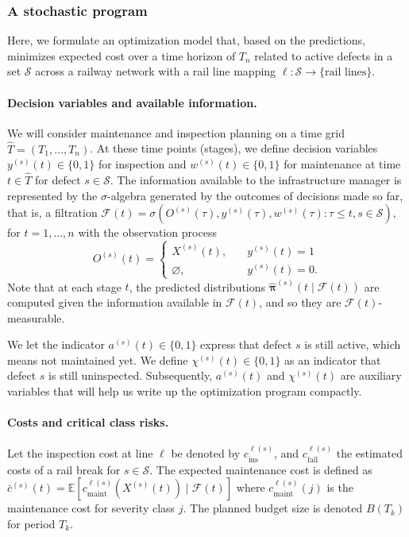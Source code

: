 \documentclass{article}
\begin{document}
\subsubsection{A stochastic program}
Here, we formulate an optimization model that, based on the predictions, minimizes expected cost over a time horizon of $T_n$ related to active defects in a set $\mathcal{S}$ across a railway network with a rail line mapping $\ell:\mathcal{S}\to\{\text{rail lines}\}$.


\paragraph{Decision variables and available information.}
We will consider maintenance and inspection planning on a time grid $\widehat T=(T_1,\dots,T_n)$.
At these time points (stages), we define decision variables 
$y^{(s)}(t)\in\{0,1\}$ for inspection and $w^{(s)}(t)\in\{0,1\}$ for maintenance at time $t \in \widehat T$ for defect $s\in\mathcal S$.
The information available to the infrastructure manager is represented by the $\sigma$-algebra generated by the outcomes of decisions made so far, that is, a filtration
$
\mathcal F(t) = \sigma \left( O^{(s)}(\tau), y^{(s)}(\tau), w^{(s)}(\tau) : \tau \leq t, s\in\mathcal S \right), 
$
for $t = 1, \dots, n$ with the observation process 
$$
O^{(s)}(t) = \begin{cases}
X^{(s)}(t), \quad &y^{(s)}(t) = 1\\ 
\varnothing, \quad &y^{(s)}(t) = 0.
\end{cases}
$$
Note that at each stage $t$, the predicted distributions $\widehat{\bm \pi}^{(s)}(t \mid \mathcal F(t))$ are computed given the information available in $\mathcal F(t)$, and so they are $\mathcal F(t)$-measurable.

We let the indicator \(a^{(s)}(t)\in\{0,1\}\) express that defect \(s\) is still active, which means not maintained yet. We define \(\chi^{(s)}(t)\in\{0,1\}\) as an indicator that defect \(s\) is still uninspected. Subsequently, $a^{(s)}(t)$ and $\chi^{(s)}(t)$ are auxiliary variables that will help us write up the optimization program compactly.


\paragraph{Costs and critical class risks.}
Let the inspection cost at line $\ell$ be denoted by $c_{\text{ins}}^{\ell(s)}$, and $c_{\text{fail}}^{\ell(s)}$ the estimated costs of a rail break for $s \in \mathcal S$.
The expected maintenance cost is defined as 
$
\bar c^{(s)}(t) = \mathds E \left[ c_{\text{maint}}^{\ell(s)} \left(X^{(s)}(t)\right) \mid \mathcal F(t) \right]
$ where $c^{\ell(s)}_{\text{maint}}(j)$ is the maintenance cost for severity class $j$. The planned budget size is denoted $B(T_k)$ for period $T_k$.
\end{document}
